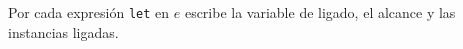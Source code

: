 \newpage

    \begin{exercise}
    Por cada expresión \texttt{let} en $e$ escribe la variable de ligado, el alcance y las instancias ligadas.
    



    \end{exercise}
	
   \bigskip

